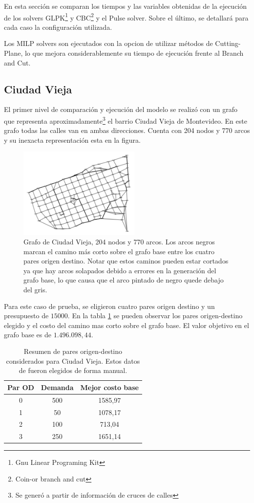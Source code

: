 \documentclass{article}
\begin{document}
  En esta sección se comparan los tiempos y las variables obtenidas de la ejecución de los solvers GLPK\footnote{Gnu Linear Programing Kit} y CBC\footnote{Coin-or branch and cut} y el Pulse solver. Sobre el último, se detallará para cada caso la configuración utilizada.

  Los MILP solvers son ejecutados con la opcion de utilizar métodos de Cutting-Plane, lo que mejora considerablemente su tiempo de ejecución frente al Branch and Cut.

  \subsection*{Ciudad Vieja}

  El primer nivel de comparación y ejecución del modelo se realizó con un grafo que representa aproximadamente\footnote{Se generó a partir de información de cruces de calles} el barrio Ciudad Vieja de Montevideo. En este grafo todas las calles van en ambas direcciones. Cuenta con 204 nodos y 770 arcos y su inexacta representación esta en la figura.

  \begin{figure}[h!]
    \centering
    \includegraphics[width=6cm]{imgs/mdeo_med_base.png}
    \caption{Grafo de Ciudad Vieja, 204 nodos y 770 arcos. Los arcos negros marcan el camino más corto sobre el grafo base entre los cuatro pares origen destino. Notar que estos caminos pueden estar cortados ya que hay arcos solapados debido a errores en la generación del grafo base, lo que causa que el arco pintado de negro quede debajo del gris.}
    \label{ciudadvieja}
  \end{figure}

  Para este caso de prueba, se eligieron cuatro pares origen destino y un presupuesto de $15000$. En la tabla \ref{table:odsciudadvieja} se pueden observar los pares origen-destino elegido y el costo del camino mas corto sobre el grafo base. El valor objetivo en el grafo base es de $1.496.098,44$.

  \begin{table}[h!]
    \centering
    \begin{tabular}{ccc}
      \toprule
      Par OD & Demanda & Mejor costo base \\
      \midrule
      0 & 500 & 1585,97 \\
      1 & 50 & 1078,17 \\
      2 & 100 & 713,04 \\
      3 & 250 & 1651,14 \\
      \bottomrule
    \end{tabular}
    \caption{Resumen de pares origen-destino considerados para Ciudad Vieja. Estos datos de fueron elegidos de forma manual.}\label{table:odsciudadvieja}
  \end{table}
  
\end{document}
